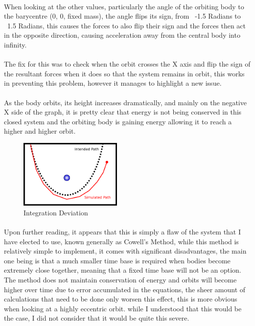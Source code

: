 \paragraph{}
When looking at the other values, particularly the angle of the orbiting body to the barycentre (0, 0, fixed mass), the angle flips its sign, from ~-1.5 Radians to ~1.5 Radians, this causes the forces to also flip their sign and the forces then act in the opposite direction, causing acceleration away from the central body into infinity.

\paragraph{}
The fix for this was to check when the orbit crosses the X axis and flip the sign of the resultant forces when it does so that the system remains in orbit, this works in preventing this problem, however it manages to highlight a new issue.

\paragraph{}
As the body orbits, its height increases dramatically, and mainly on the negative X side of the graph, it is pretty clear that energy is not being conserved in this closed system and the orbiting body is gaining energy allowing it to reach a higher and higher orbit.

\begin{figure}
  \centering
  \includegraphics[width=0.45\textwidth]{img/orbitbad.png}
  \caption{Integration Deviation}

\end{figure}

\paragraph{}
Upon further reading, it appears that this is simply a flaw of the system that I have elected to use, known generally as Cowell’s Method, while this method is relatively simple to implement, it comes with significant disadvantages, the main one being is that a much smaller time base is required when bodies become extremely close together, meaning that a fixed time base will not be an option. The method does not maintain conservation of energy and orbits will become higher over time due to error accumulated in the equations, the sheer amount of calculations that need to be done only worsen this effect, this is more obvious when looking at a highly eccentric orbit. while I understood that this would be the case, I did not consider that it would be quite this severe.

